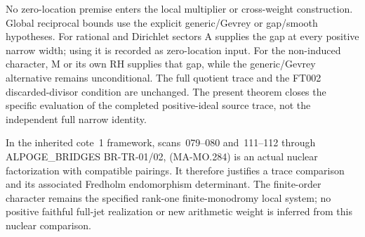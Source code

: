 No zero-location premise enters the local multiplier or
cross-weight construction. Global reciprocal bounds use the
explicit generic/Gevrey or gap/smooth hypotheses. For rational
and Dirichlet sectors A supplies the gap at every positive
narrow width; using it is recorded as zero-location input.
For the non-induced character, M or its own RH supplies that
gap, while the generic/Gevrey alternative remains unconditional.
The full quotient trace and the FT002 discarded-divisor
condition are unchanged. The present theorem closes the
specific evaluation of the completed positive-ideal source
trace, not the independent full narrow identity.

In the inherited cote~1 framework, scans~079--080 and~111--112
through ALPOGE\_BRIDGES BR-TR-01/02, (MA-MO.284) is an actual
nuclear factorization with compatible pairings. It therefore
justifies a trace comparison and its associated Fredholm
endomorphism determinant. The finite-order character remains
the specified rank-one finite-monodromy local system; no
positive faithful full-jet realization or new arithmetic weight
is inferred from this nuclear comparison.
